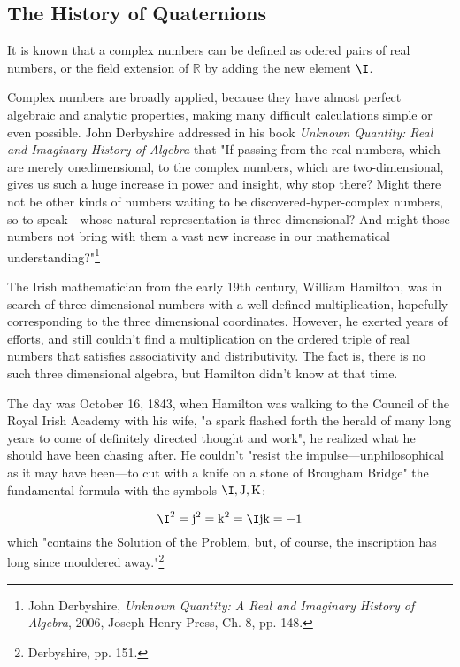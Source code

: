 


\subsection{The History of Quaternions}

It is known that a complex numbers can be defined as odered pairs of real numbers, or the field extension of $\mathbb{R}$ by adding the new element $\I$. 

Complex numbers are broadly applied, because they have almost perfect algebraic and analytic properties, making many difficult calculations simple or even possible. John Derbyshire addressed in his book \textsl{Unknown Quantity: Real and Imaginary History of Algebra} that "If passing from the real numbers, which are merely onedimensional, to the complex numbers, which are two-dimensional, gives us such a huge increase in power and insight, why stop there? Might there not be other kinds of numbers waiting to be discovered-hyper-complex numbers, so to speak—whose natural representation is three-dimensional? And might those numbers not bring with them a vast new increase in our mathematical understanding?"\footnote{John Derbyshire, \textsl{Unknown Quantity: A Real and Imaginary History of Algebra}, 2006, Joseph Henry Press, Ch. 8, pp. 148. }

The Irish mathematician from the early 19th century, William Hamilton, was in search of three-dimensional numbers with a well-defined multiplication, hopefully corresponding to the three dimensional coordinates. However, he exerted years of efforts, and still couldn't find a multiplication on the ordered triple of real numbers that satisfies associativity and distributivity. The fact is, there is no such three dimensional algebra, but Hamilton didn't know at that time. 


The day was October 16, 1843, when Hamilton was walking to the Council of the Royal Irish Academy with his wife, "a spark flashed forth the herald of many long years to come of definitely directed thought and work", he realized what he should have been chasing after. He couldn't "resist the impulse—unphilosophical as it may have been—to cut with a knife on a stone of Brougham Bridge" the fundamental formula with the symbols $\I, \mathrm{J}, \mathrm{K}$:

\begin{equation}
\I^2=\mathrm{j}^2=\mathrm{k}^2=\I\mathrm{j}\mathrm{k}=-1
\end{equation}
which "contains the Solution of the Problem, but, of course, the inscription
has long since mouldered away."\footnote{Derbyshire, pp. 151. }

